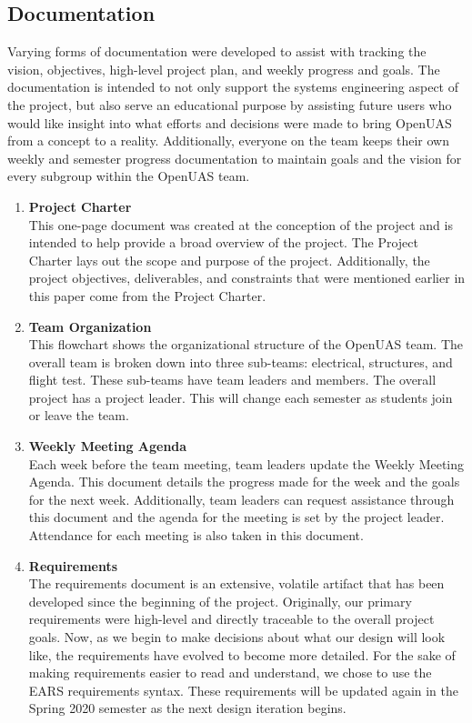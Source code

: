\documentclass{article}
\begin{document}
\subsection{Documentation}

Varying forms of documentation were developed to assist with tracking the vision, objectives, high-level project plan, and weekly progress and goals. The documentation is intended to not only support the systems engineering aspect of the project, but also serve an educational purpose by assisting future users who would like insight into what efforts and decisions were made to bring OpenUAS from a concept to a reality. Additionally, everyone on the team keeps their own weekly and semester progress documentation to maintain goals and the vision for every subgroup within the OpenUAS team. 

\begin{enumerate}
\item \textbf{Project Charter}\\ This one-page document was created at the conception of the project and is intended to help provide a broad overview of the project. The Project Charter lays out the scope and purpose of the project. Additionally, the project objectives, deliverables, and constraints that were mentioned earlier in this paper come from the Project Charter. 
\item \textbf{Team Organization}\\ This flowchart shows the organizational structure of the OpenUAS team. The overall team is broken down into three sub-teams: electrical, structures, and flight test. These sub-teams have team leaders and members. The overall project has a project leader. This will change each semester as students join or leave the team. 
\item \textbf{Weekly Meeting Agenda}\\Each week before the team meeting, team leaders update the Weekly Meeting Agenda. This document details the progress made for the week and the goals for the next week. Additionally, team leaders can request assistance through this document and the agenda for the meeting is set by the project leader. Attendance for each meeting is also taken in this document. 
\item \textbf{Requirements}\\ The requirements document is an extensive, volatile artifact that has been developed since the beginning of the project. Originally, our primary requirements were high-level and directly traceable to the overall project goals. Now, as we begin to make decisions about what our design will look like, the requirements have evolved to become more detailed. For the sake of making requirements easier to read and understand, we chose to use the EARS \cite{Terzakis2013} requirements syntax. These requirements will be updated again in the Spring 2020 semester as the next design iteration begins. 
\end{enumerate}
\end{document}
